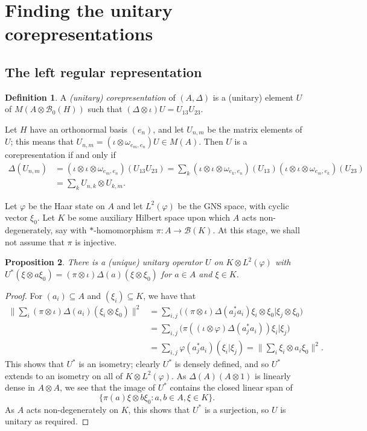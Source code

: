 \documentclass[twoside,a4paper,12pt]{article}
\theoremstyle{plain}
\newtheorem{proposition}{Proposition}[section]
\theoremstyle{definition}
\newtheorem{definition}[proposition]{Definition}
\newcommand{\mc}{\mathcal}
\begin{document}
\appendix
\section{Finding the unitary corepresentations}

\subsection{The left regular representation}\label{sec:leftregcorep}

\begin{definition}
A \emph{(unitary) corepresentation} of $(A,\Delta)$ is a (unitary) element
$U$ of $M(A\otimes\mc B_0(H))$ such that $(\Delta\otimes\iota)U
= U_{13} U_{23}$.
\end{definition}

Let $H$ have an orthonormal basis $(e_n)$, and let $U_{n,m}$ be the matrix
elements of $U$; this means that $U_{n,m} = (\iota\otimes\omega_{e_m,e_n})U
\in M(A)$.  Then $U$ is a corepresentation if and only if
\begin{align*} \Delta(U_{n,m})
&= (\iota\otimes\iota\otimes\omega_{e_m,e_n})(U_{13}U_{23})
= \sum_k (\iota\otimes\iota\otimes\omega_{e_k,e_n})(U_{13})
(\iota\otimes\iota\otimes\omega_{e_m,e_k})(U_{23}) \\
&= \sum_k U_{n,k} \otimes U_{k,m}. \end{align*}

Let $\varphi$ be the Haar state on $A$ and let $L^2(\varphi)$ be the GNS space,
with cyclic vector $\xi_0$.  Let $K$ be some auxiliary Hilbert space upon which
$A$ acts non-degenerately, say with $*$-homomorphism $\pi:A\rightarrow\mc B(K)$.
At this stage, we shall not assume that $\pi$ is injective.

\begin{proposition}
There is a (unique) unitary operator $U$ on $K\otimes L^2(\varphi)$ with
$U^*(\xi\otimes a\xi_0) = (\pi\otimes\iota)\Delta(a)(\xi\otimes\xi_0)$
for $a\in A$ and $\xi\in K$.
\end{proposition}
\begin{proof}
For $(a_i)\subseteq A$ and $(\xi_i)\subseteq K$, we have that
\begin{align*}
\Big\| \sum_i (\pi\otimes\iota)\Delta(a_i)(\xi_i\otimes\xi_0) \Big\|^2 &=
\sum_{i,j} \big( (\pi\otimes\iota)\Delta(a_j^*a_i) \xi_i\otimes\xi_0
   \big| \xi_j\otimes\xi_0 \big) \\
&= \sum_{i,j} \big( \pi((\iota\otimes\varphi)\Delta(a_j^*a_i))
   \xi_i\big|\xi_j\big) \\
&= \sum_{i,j} \varphi(a_j^*a_i) (\xi_i|\xi_j)
= \Big\| \sum_i \xi_i \otimes a_i\xi_0 \Big\|^2.
\end{align*}
This shows that $U^*$ is an isometry; clearly $U^*$ is densely defined,
and so $U^*$ extends to an isometry on all of $K\otimes L^2(\varphi)$.  As
$\Delta(A)(A\otimes 1)$ is linearly dense in $A\otimes A$, we see that
the image of $U^*$ contains the closed linear span of
\[ \big\{ \pi(a)\xi \otimes b\xi_0 : a,b\in A, \xi\in K \big\}. \]
As $A$ acts non-degenerately on $K$, this shows that $U^*$ is a surjection,
so $U$ is unitary as required.
\end{proof}
\end{document}
